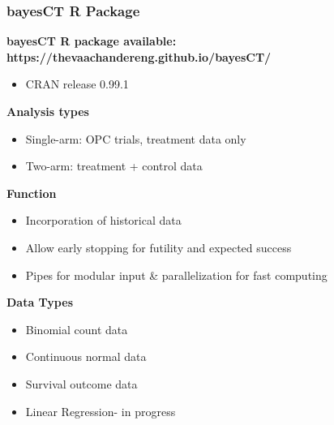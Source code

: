 \documentclass{beamer}
\begin{document}
\begin{frame}
\frametitle{bayesCT R Package}

\textbf{bayesCT R package available: https://thevaachandereng.github.io/bayesCT/} \\
\begin{itemize}
\item CRAN release 0.99.1 \\
\end{itemize}

\textbf{Analysis types} \\
\begin{itemize}
\item  Single-arm: OPC trials, treatment data only 
\item Two-arm: treatment + control data 
\end{itemize}

\textbf{Function} \\
\begin{itemize}
\item Incorporation of historical data \\
\item Allow early stopping for futility and expected success \\
\item Pipes for modular input \& parallelization for fast computing \\
\end{itemize}

\textbf{Data Types} \\
\begin{itemize}
\item  Binomial count data\\
\item Continuous normal data \\
\item Survival outcome data \\
\item Linear Regression- in progress
\end{itemize}
\end{frame}


\end{document}
